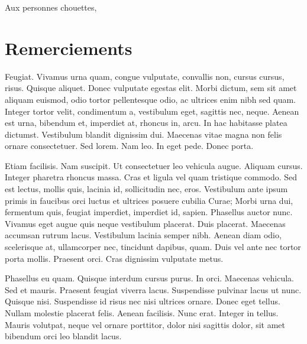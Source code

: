 \documentclass[../hdr.tex]{subfiles}
\begin{document}
\begin{dedication}
	Aux personnes chouettes,
\end{dedication}

\chapter*{Remerciements}

\hypertarget{prolegopage}{}%
\hypertarget{mercipage}{}%

Feugiat. Vivamus urna quam, congue vulputate, convallis non, cursus cursus,
risus. Quisque aliquet. Donec vulputate egestas elit. Morbi dictum, sem sit amet
aliquam euismod, odio tortor pellentesque odio, ac ultrices enim nibh sed quam.
Integer tortor velit, condimentum a, vestibulum eget, sagittis nec, neque.
Aenean est urna, bibendum et, imperdiet at, rhoncus in, arcu. In hac habitasse
platea dictumst. Vestibulum blandit dignissim dui. Maecenas vitae magna non
felis ornare consectetuer. Sed lorem. Nam leo. In eget pede. Donec porta.

Etiam facilisis. Nam suscipit. Ut consectetuer leo vehicula augue. Aliquam
cursus. Integer pharetra rhoncus massa. Cras et ligula vel quam tristique
commodo. Sed est lectus, mollis quis, lacinia id, sollicitudin nec, eros.
Vestibulum ante ipsum primis in faucibus orci luctus et ultrices posuere cubilia
Curae; Morbi urna dui, fermentum quis, feugiat imperdiet, imperdiet id, sapien.
Phasellus auctor nunc. Vivamus eget augue quis neque vestibulum placerat. Duis
placerat. Maecenas accumsan rutrum lacus. Vestibulum lacinia semper nibh. Aenean
diam odio, scelerisque at, ullamcorper nec, tincidunt dapibus, quam. Duis vel
ante nec tortor porta mollis. Praesent orci. Cras dignissim vulputate metus.

Phasellus eu quam. Quisque interdum cursus purus. In orci. Maecenas vehicula.
Sed et mauris. Praesent feugiat viverra lacus. Suspendisse pulvinar lacus ut
nunc. Quisque nisi. Suspendisse id risus nec nisi ultrices ornare. Donec eget
tellus. Nullam molestie placerat felis. Aenean facilisis. Nunc erat. Integer in
tellus. Mauris volutpat, neque vel ornare porttitor, dolor nisi sagittis dolor,
sit amet bibendum orci leo blandit lacus.
\end{document}
